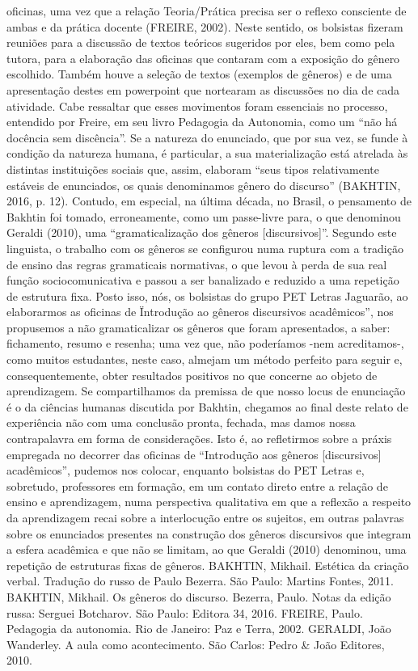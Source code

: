 oficinas, uma vez que a relação Teoria/Prática precisa ser o reflexo consciente de ambas e da
prática docente (FREIRE, 2002). Neste sentido, os bolsistas fizeram reuniões para a discussão de
textos teóricos sugeridos por eles, bem como pela tutora, para a elaboração das oficinas que
contaram com a exposição do gênero escolhido. Também houve a seleção de textos (exemplos de
gêneros) e de uma apresentação destes em powerpoint que nortearam as discussões no dia de
cada atividade. Cabe ressaltar que esses movimentos foram essenciais no processo, entendido
por Freire, em seu livro Pedagogia da Autonomia, como um “não há docência sem discência”.
Se a natureza do enunciado, que por sua vez, se funde à condição da natureza humana, é
particular, a sua materialização está atrelada às distintas instituições sociais que, assim, elaboram
“seus tipos relativamente estáveis de enunciados, os quais denominamos gênero do discurso”
(BAKHTIN, 2016, p. 12). Contudo, em especial, na última década, no Brasil, o pensamento de
Bakhtin foi tomado, erroneamente, como um passe-livre para, o que denominou Geraldi (2010),
uma “gramaticalização dos gêneros [discursivos]”. Segundo este linguista, o trabalho com os
gêneros se configurou numa ruptura com a tradição de ensino das regras gramaticais normativas,
o que levou à perda de sua real função sociocomunicativa e passou a ser banalizado e reduzido a
uma repetição de estrutura fixa. Posto isso, nós, os bolsistas do grupo PET Letras Jaguarão, ao
elaborarmos as oficinas de \"Introdução ao gêneros discursivos acadêmicos”, nos propusemos a
não gramaticalizar os gêneros que foram apresentados, a saber: fichamento, resumo e resenha;
uma vez que, não poderíamos -nem acreditamos-, como muitos estudantes, neste caso, almejam
um método perfeito para seguir e, consequentemente, obter resultados positivos no que concerne
ao objeto de aprendizagem.
Se compartilhamos da premissa de que nosso locus de enunciação é o da ciências
humanas discutida por Bakhtin, chegamos ao final deste relato de experiência não com uma
conclusão pronta, fechada, mas damos nossa contrapalavra em forma de considerações. Isto é,
ao refletirmos sobre a práxis empregada no decorrer das oficinas de “Introdução aos gêneros
[discursivos] acadêmicos”, pudemos nos colocar, enquanto bolsistas do PET Letras e, sobretudo,
professores em formação, em um contato direto entre a relação de ensino e aprendizagem, numa
perspectiva qualitativa em que a reflexão a respeito da aprendizagem recai sobre a interlocução
entre os sujeitos, em outras palavras sobre os enunciados presentes na construção dos gêneros
discursivos que integram a esfera acadêmica e que não se limitam, ao que Geraldi (2010)
denominou, uma repetição de estruturas fixas de gêneros.
BAKHTIN, Mikhail. Estética da criação verbal. Tradução do russo de Paulo Bezerra. São
Paulo: Martins Fontes, 2011.
BAKHTIN, Mikhail. Os gêneros do discurso. Bezerra, Paulo. Notas da edição russa: Serguei
Botcharov. São Paulo: Editora 34, 2016.
FREIRE, Paulo. Pedagogia da autonomia. Rio de Janeiro: Paz e Terra, 2002.
GERALDI, João Wanderley. A aula como acontecimento. São Carlos: Pedro & João Editores,
2010.

